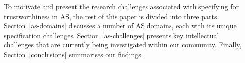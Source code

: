 \documentclass[sigconf,nonacm]{acmart}%
\begin{document}
%	
	To motivate and present the research challenges associated with specifying for trustworthiness in AS, the rest of this paper is divided into three parts. Section~\ref{as-domains} discusses a number of AS domains, each with its unique specification challenges. Section~\ref{as-challenges} presents key intellectual challenges that are currently being investigated within our community. Finally, Section~\ref{conclusions} summarises our findings.
\end{document}
